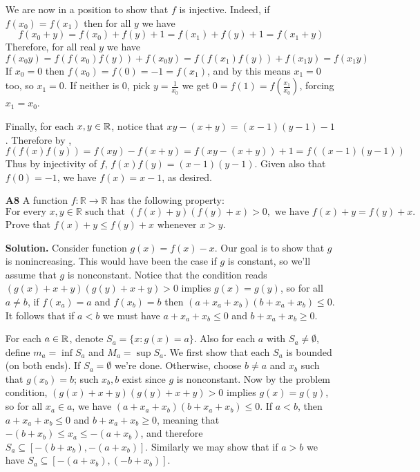 \documentclass[11pt,a4paper]{article}
\begin{document}
\begin{enumerate}
    We are now in a position to show that $f$ is injective. 
    Indeed, if $f(x_0) = f(x_1)$ then for all $y$ we have 
    \[f(x_0 + y)=f(x_0) + f(y) + 1=f(x_1) + f(y) + 1=f(x_1 + y)
    \]
    Therefore, for all real $y$ we have 
    \[
    f(x_0y) = f(f(x_0)f(y)) + f(x_0y) = f(f(x_1)f(y)) + f(x_1y) = f(x_1y)
    \]
    If $x_0=0$ then $f(x_0)=f(0)=-1=f(x_1)$, and by  this means $x_1=0$ too, so $x_1=0$. 
    If neither is 0, pick $y=\frac{1}{x_0}$ we get $0 = f(1) = f(\frac{x_1}{x_0})$, forcing $x_1=x_0$. 
    
    Finally, for each $x, y\in\mathbb{R}$, notice that $xy - (x + y) = (x - 1)(y - 1) - 1$. Therefore 
    by , 
    \[
    f(f(x)f(y)) = f(xy) - f(x + y) = f(xy - (x + y)) + 1 = f((x-1)(y-1))
    \]
    Thus by injectivity of $f$, $f(x)f(y) = (x - 1)(y - 1)$. 
    Given also that $f(0)=-1$, we have $f(x)=x-1$, as desired. 
	
	\item[\textbf{A8}]
	A function $f:\mathbb{R} \to \mathbb{R}$ has the following property:
	$$\text{For every } x,y \in \mathbb{R} \text{ such that }(f(x)+y)(f(y)+x) > 0, \text{ we have } f(x)+y = f(y)+x.$$Prove that $f(x)+y \leq f(y)+x$ whenever $x>y$.
	
	\textbf{Solution.} 
	Consider function $g(x) = f(x)-x$. Our goal is to show that $g$ is nonincreasing. 
	This would have been the case if $g$ is constant, so we'll assume that $g$ is nonconstant. 
	Notice that the condition reads $(g(x) + x + y)(g(y)+x+y) > 0$ implies $g(x)=g(y)$, 
	so for all $a\neq b$, if $f(x_a)=a$ and $f(x_b)=b$ then 
	$(a+x_a+x_b)(b+x_a+x_b)\le 0$. 
	It follows that if $a < b$ we must have $a+x_a+x_b\le 0$ and $b +x_a+x_b \ge 0$. 
	
	For each $a\in\mathbb{R}$, denote $S_a = \{x: g(x) = a\}$. 
	Also for each $a$ with $S_a\neq\emptyset$, define $m_a = \inf S_a$ and $M_a = \sup S_a$. 
	We first show that each $S_a$ is bounded (on both ends). 
	If $S_a=\emptyset$ we're done. 
	Otherwise, choose $b\neq a$ and $x_b$ such that $g(x_b)=b$; 
	such $x_b, b$ exist since $g$ is nonconstant. 
	Now by the problem condition, $(g(x)+x+y)(g(y)+x+y) > 0$ implies $g(x)=g(y)$, 
	so for all $x_a\in a$, we have $(a+x_a+x_b)(b+x_a+x_b)\le 0$. 
	If $a < b$, then $a+x_a+x_b\le 0$ and $b + x_a + x_b\ge 0$, 
	meaning that $-(b+x_b)\le x_a\le -(a+x_b)$, 
	and therefore $S_a\subseteq [-(b+x_b), -(a+x_b)]$. 
	Similarly we may show that if $a > b$ we have $S_a\subseteq [-(a+x_b), (-b+x_b)]$. 
	

\end{enumerate}
\end{document}
